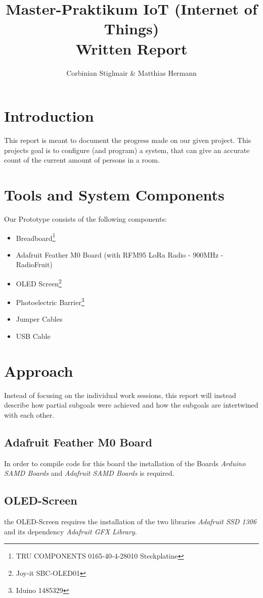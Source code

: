 \documentclass[]{article}
\title{Master-Praktikum IoT (Internet of Things)\\Written Report}
\author{Corbinian Stiglmair \& Matthias Hermann}
\begin{document}
\maketitle
\newpage
\tableofcontents
\newpage

\begin{sloppypar}
\section{Introduction}
This report is meant to document the progress made on our given project. This projects goal is to configure (and program) a system, that can give an accurate count of the current amount of persons in a room.
\section{Tools and System Components}
Our Prototype consists of the following components:
\begin{itemize}
	\item Breadboard\footnote{TRU COMPONENTS 0165-40-4-28010 Steckplatine}
	\item Adafruit Feather M0 Board (with RFM95 LoRa Radio - 900MHz - RadioFruit)
	\item OLED Screen\footnote{Joy-it SBC-OLED01}
	\item Photoelectric Barrier\footnote{Iduino 1485329}
	\item Jumper Cables
	\item USB Cable
\end{itemize}
\section{Approach}
Instead of focusing on the individual work sessions, this report will instead describe how partial subgoals were achieved and how the subgoals are intertwined with each other.
\subsection{Adafruit Feather M0 Board}
In order to compile code for this board the installation of the Boards \textit{Arduino SAMD Boards} and \textit{Adafruit SAMD Boards} is required.
\subsection{OLED-Screen}
the OLED-Screen requires the installation of the two libraries \textit{Adafruit SSD 1306} and its dependency \textit{Adafruit GFX Library}.

\end{sloppypar}
\end{document}

